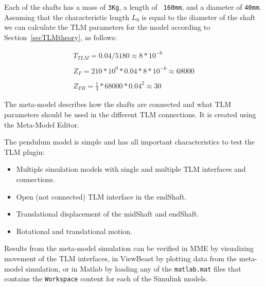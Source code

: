 Each of the shafts has a mass of {\tt 3Kg}, a length of {\tt
160mm}, and a diameter of {\tt 40mm}. Assuming that the characteristic
length $L_0$ is equal to the diameter of the shaft we can calculate
the TLM parameters for the model according to Section~\ref{secTLMtheory}, as follows:

\begin{equation}
\begin{array}{l}
T_{TLM} =  0.04/5180 \approx 8*10^{-6} \\
\\
Z_F =  210*10^{9} * 0.04 * 8*10^{-6} \approx 68000 \\
\\
Z_{FR} =  \frac{1}{4}*68000*0.04^2 \approx 30
\end{array}
\end{equation}

The meta-model describes how the shafts are connected and what TLM
parameters should be used in the different TLM connections. It is
created using the Meta-Model Editor.

The pendulum model is simple and has all important characteristics to
test the TLM plugin:
\begin{itemize}
\item Multiple simulation models with single and multiple TLM
	interfaces and connections.
\item Open (not connected) TLM interface in the endShaft.
\item Translational displacement of the midShaft and endShaft.
\item Rotational and translational motion.
\end{itemize}

Results from the meta-model simulation can be verified in MME by
visualizing movement of the TLM interfaces, in ViewBeast by plotting
data from the meta-model simulation, or in Matlab by loading any of
the {\tt matlab.mat} files that contains the {\tt Workspace} content
for each of the Simulink models.

